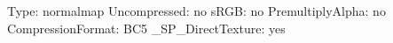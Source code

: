 Type: normalmap
Uncompressed: no
sRGB: no
PremultiplyAlpha: no
CompressionFormat: BC5
_SP_DirectTexture: yes
